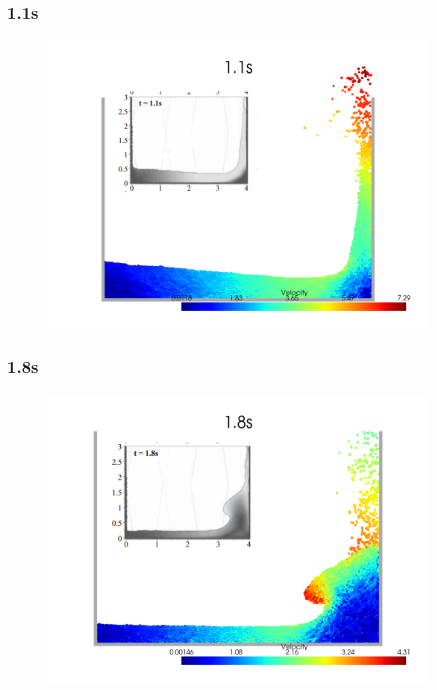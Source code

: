 \begin{frame}
    \frametitle{\subsecname 1.1s}
    \begin{figure}[H]
        \centering
        \includegraphics[width=0.9\textwidth]{images/collapse_dry11_combined.png}
    \end{figure}
\end{frame}

\begin{frame}
    \frametitle{\subsecname 1.8s}
    \begin{figure}[H]
        \centering
        \includegraphics[width=0.9\textwidth]{images/collapse_dry18_combined.png}
    \end{figure}
\end{frame}

